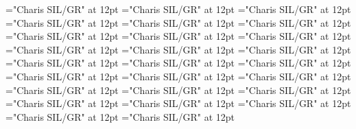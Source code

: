 \documentclass[a4paper]{article}
\begin{document}
\pagestyle{plain}
\sloppy
\setlength{\parfillskip}{0pt plus 1fil}
\font{}="Charis SIL/GR" at 12pt
\font{}="Charis SIL/GR" at 12pt
\font{}="Charis SIL/GR" at 12pt
\font\entryletDatadicBody="Charis SIL/GR" at 12pt
\font\headwordsehentryletDatadicBody="Charis SIL/GR" at 12pt
\font\xhomographnumberptheadwordsehentryletDatadicBody="Charis SIL/GR" at 12pt
\font\sensesentryletDatadicBody="Charis SIL/GR" at 12pt
\font\sensesensesentryletDatadicBody="Charis SIL/GR" at 12pt
\font\xsensenumberLcensensesensesentryletDatadicBody="Charis SIL/GR" at 12pt
\font\grammaticalinfosensesensesentryletDatadicBody="Charis SIL/GR" at 12pt
\font\partofspeechptgrammaticalinfosensesensesentryletDatadicBody="Charis SIL/GR" at 12pt
\font\slotsgrammaticalinfosensesensesentryletDatadicBody="Charis SIL/GR" at 12pt
\font\xitemslotsgrammaticalinfosensesensesentryletDatadicBody="Charis SIL/GR" at 12pt
\font\slotnameptxitemslotsgrammaticalinfosensesensesentryletDatadicBody="Charis SIL/GR" at 12pt
\font{}="Charis SIL/GR" at 12pt
\font\xitemptdefinitionLbptsensesensesentryletDatadicBody="Charis SIL/GR" at 12pt
\font\xlanguagetagenxitemptdefinitionLbptsensesensesentryletDatadicBody="Charis SIL/GR" at 12pt
\font\xitemendefinitionLbptsensesensesentryletDatadicBody="Charis SIL/GR" at 12pt
\font\xlanguagetagenxitemendefinitionLbptsensesensesentryletDatadicBody="Charis SIL/GR" at 12pt
\font\slotnameptslotsgrammaticalinfosensesensesentryletDatadicBody="Charis SIL/GR" at 12pt
\font\relationantonymptsensesensesentryletDatadicBody="Charis SIL/GR" at 12pt
\font\xitemptrelationantonymptsensesensesentryletDatadicBody="Charis SIL/GR" at 12pt
\font\xlanguagetagenxitemptrelationantonymptsensesensesentryletDatadicBody="Charis SIL/GR" at 12pt
\font\xitemenrelationantonymptsensesensesentryletDatadicBody="Charis SIL/GR" at 12pt
\font\xlanguagetagenxitemenrelationantonymptsensesensesentryletDatadicBody="Charis SIL/GR" at 12pt
\font\xsensenumberLbensensesensesentryletDatadicBody="Charis SIL/GR" at 12pt

\mbox{} 
\newpage 
\newpage 
\setcounter{page}{1} 
\pagestyle{fancy} 

\end{document}
